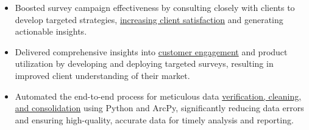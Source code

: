 \documentclass[letterpaper]{article}
\newenvironment{jobtasklist}
        {
            \vspace{-12pt}
            \begin{itemize} \itemsep 0pt
        }{
            \end{itemize}
            \vspace{-3pt}
        }
\newcommand{\impt}[1]{\uline{#1}}
\begin{document}
\begin{jobtasklist}
%
%
%
%

        \item Boosted survey campaign effectiveness by consulting closely with clients to develop targeted
                strategies, \impt{increasing client satisfaction} and generating actionable insights.
        \item Delivered comprehensive insights into \impt{customer engagement} and product utilization by developing
                and deploying targeted surveys, resulting in improved client understanding of their market.
        \item Automated the end-to-end process for meticulous data
                \impt{verification, cleaning, and consolidation} using Python and ArcPy,
                significantly reducing data errors and ensuring high-quality, accurate data for timely analysis and reporting.
\end{jobtasklist}
\end{document}
